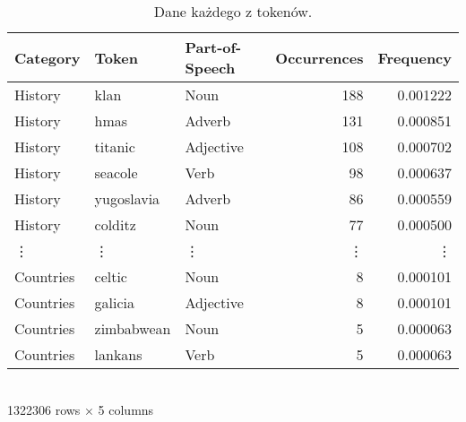 \begin{table}[H]
    \centering
        \begin{tabular}{lllrr}
            \toprule
            Category &      Token & Part-of-Speech &  Occurrences &  Frequency \\
            \midrule
               History &         klan &                  Noun &          188 &   0.001222 \\
               History &         hmas &                Adverb &          131 &   0.000851 \\
               History &      titanic &             Adjective &          108 &   0.000702 \\
               History &      seacole &                  Verb &           98 &   0.000637 \\
               History &   yugoslavia &                Adverb &           86 &   0.000559 \\
               History &      colditz &                  Noun &           77 &   0.000500 \\
                \vdots &       \vdots &                \vdots &       \vdots & 	   \vdots \\
             Countries &       celtic &                  Noun &            8 &   0.000101 \\
             Countries &      galicia &             Adjective &            8 &   0.000101 \\
             Countries &   zimbabwean &                  Noun &            5 &   0.000063 \\
             Countries &      lankans &                  Verb &            5 &   0.000063 \\
            \bottomrule
        \end{tabular}\\
        1322306 rows × 5 columns
        \vspace{0.25cm}
        \caption{Dane każdego z tokenów.}
        \label{tab:tokens_table}
\end{table}